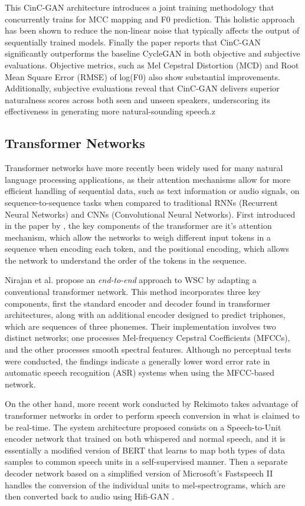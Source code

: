 This CinC-GAN architecture introduces a joint training methodology that concurrently trains for MCC mapping and F0 prediction. This holistic approach has been shown to reduce the non-linear noise that typically affects the output of sequentially trained models. Finally the paper reports that CinC-GAN significantly outperforms the baseline CycleGAN in both objective and subjective evaluations. Objective metrics, such as Mel Cepstral Distortion (MCD) and Root Mean Square Error (RMSE) of log(F0) also show substantial improvements. Additionally, subjective evaluations reveal that CinC-GAN delivers superior naturalness scores across both seen and unseen speakers, underscoring its effectiveness in generating more natural-sounding speech.z 

\subsection{Transformer Networks}

Transformer networks have more recently been widely used for many natural language processing applications, as their attention mechanisms allow for more efficient handling of sequential data, such as text information or audio signals, on sequence-to-sequence tasks when compared to traditional RNNs (Recurrent Neural Networks) and CNNs (Convolutional Neural Networks). First introduced in the paper by \cite{vaswani2023attention}, the key components of the transformer are it's attention mechanism, which allow the networks to weigh different input tokens in a sequence when encoding each token, and the positional encoding, which allows the network to understand the order of the tokens in the sequence.

Nirajan et al. \cite{niranjanEndtoEndWhisperNatural2021} propose an {\it end-to-end} approach to WSC by adapting a conventional transformer network. This method incorporates three key components, first the standard encoder and decoder found in transformer architectures, along with an additional encoder designed to predict triphones, which are sequences of three phonemes. Their implementation involves two distinct networks; one processes Mel-frequency Cepstral Coefficients (MFCCs), and the other processes smooth spectral features. Although no perceptual tests were conducted, the findings indicate a generally lower word error rate in automatic speech recognition (ASR) systems when using the MFCC-based network.

On the other hand, more recent work conducted by Rekimoto \cite{rekimotoWESPERZeroshotRealtime2023} takes advantage of transformer networks in order to perform speech conversion in what is claimed to be real-time. The system architecture proposed consists on a Speech-to-Unit encoder network that trained on both whispered and normal speech, and it is essentially a modified version of BERT that learns to map both types of data samples to common speech units in a self-supervised manner. Then a separate decoder network based on a simplified version of Microsoft's Fastspeech II \cite{ren2022fastspeech2fasthighquality} handles the conversion of the individual units to mel-spectrograms, which are then converted back to audio using Hifi-GAN \cite{kong2020hifigangenerativeadversarialnetworks}. 

